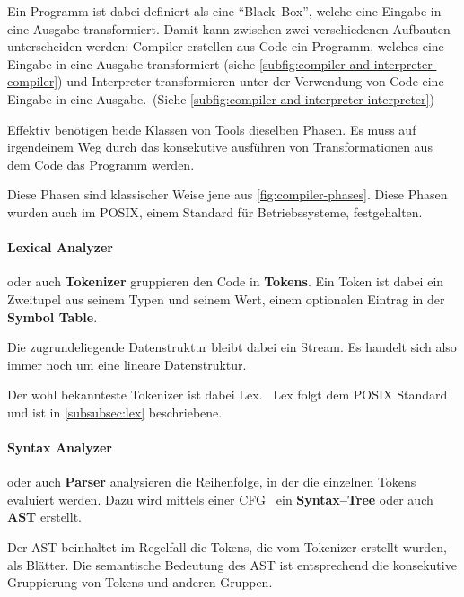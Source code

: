 Ein Programm ist dabei definiert als eine \enquote{Black--Box}, welche eine Eingabe in eine Ausgabe transformiert.
Damit kann zwischen zwei verschiedenen Aufbauten unterscheiden werden: Compiler erstellen aus Code ein Programm, welches eine Eingabe in eine Ausgabe transformiert (siehe \autoref{subfig:compiler-and-interpreter-compiler}) und Interpreter transformieren unter der Verwendung von Code eine Eingabe in eine Ausgabe.~(Siehe \autoref{subfig:compiler-and-interpreter-interpreter})

Effektiv benötigen beide Klassen von Tools dieselben Phasen.
Es muss auf irgendeinem Weg durch das konsekutive ausführen von Transformationen aus dem Code das Programm werden.

Diese Phasen sind klassischer Weise jene aus \autoref{fig:compiler-phases}.
Diese Phasen wurden auch im \ac{POSIX}, einem Standard für Betriebssysteme, festgehalten.~\autocite{ieee-sa-1993}

\paragraph{Lexical Analyzer} oder auch \textbf{Tokenizer} gruppieren den Code in \textbf{Tokens}.
Ein Token ist dabei ein Zweitupel aus seinem Typen und seinem Wert, einem optionalen Eintrag in der \textbf{Symbol Table}.

Die zugrundeliegende Datenstruktur bleibt dabei ein Stream.
Es handelt sich also immer noch um eine lineare Datenstruktur.

Der wohl bekannteste Tokenizer ist dabei Lex.~\autocite{wikipedia-contributors-2024G}
Lex folgt dem \ac{POSIX} Standard und ist in \autoref{subsubsec:lex} beschriebene.

\paragraph{Syntax Analyzer} oder auch \textbf{Parser} analysieren die Reihenfolge, in der die einzelnen Tokens evaluiert werden.
Dazu wird mittels einer \ac{CFG}~\autocite{wikipedia-contributors-2024H} ein \textbf{Syntax--Tree} oder auch \textbf{\ac{AST}} erstellt.

Der \ac{AST} beinhaltet im Regelfall die Tokens, die vom Tokenizer erstellt wurden, als Blätter.
Die semantische Bedeutung des \ac{AST} ist entsprechend die konsekutive Gruppierung von Tokens und anderen Gruppen.

